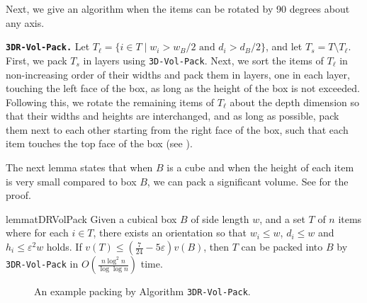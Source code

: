 \documentclass[10pt,a4paper]{amsart}
\newcommand{\kvn}[1]{#1}
\renewcommand{\epsilon}{\varepsilon} %
\theoremstyle{definition}
\begin{document}
Next, we give an algorithm when the items can be rotated by 90 degrees about any axis.

\noindent \textbf{\texttt{3DR-Vol-Pack.}}
Let $T_{\ell} = \{i\in T \mid w_i > w_B/2 \text{ and } d_i > d_B/2\}$, and let $T_s = T\setminus T_{\ell}$. First, we pack $T_s$ in layers 
using \texttt{3D-Vol-Pack}. Next, we sort the items of $T_{\ell}$ in non-increasing order of their widths and pack them in layers, 
one in each layer, touching the left face of the box, as long as the height of the box is not exceeded. Following this, 
we rotate the remaining items of $T_{\ell}$ about the depth dimension so that their widths and heights are interchanged, and as 
long as possible, pack them \kvn{next to each other} starting from the right face of the box, such that each item touches the top face of the box (see ). 

The next lemma states that when \kvn{$B$ is a cube and when} the height of each item is very small compared to box $B$, we can pack a significant volume.
See  for the proof.




\begin{restatable}{lemma}{tDRVolPack}
\label{lem:3DRVolPack}
    Given a cubical box $B$ of side length $w$,
    and a set $T$ of \kvn{$n$ items} where for each $i\in T$, there exists an orientation so that $w_i \le w$, $d_i \le w$ and $h_i \le \epsilon^2 w$ holds. 
    If $v(T) \le \left(\frac{7}{24}-5\epsilon\right)v(B)$, then $T$ can be packed into $B$ by \texttt{3DR-Vol-Pack} in $O\left(\frac{n \log^2 n}{\log \log n}\right)$ time.
\end{restatable}
\begin{figure}
    \centering
    
    \caption{An example packing by Algorithm \texttt{3DR-Vol-Pack}.}
    \label{fig:3d-r-vol-pack}
\end{figure}
\end{document}
